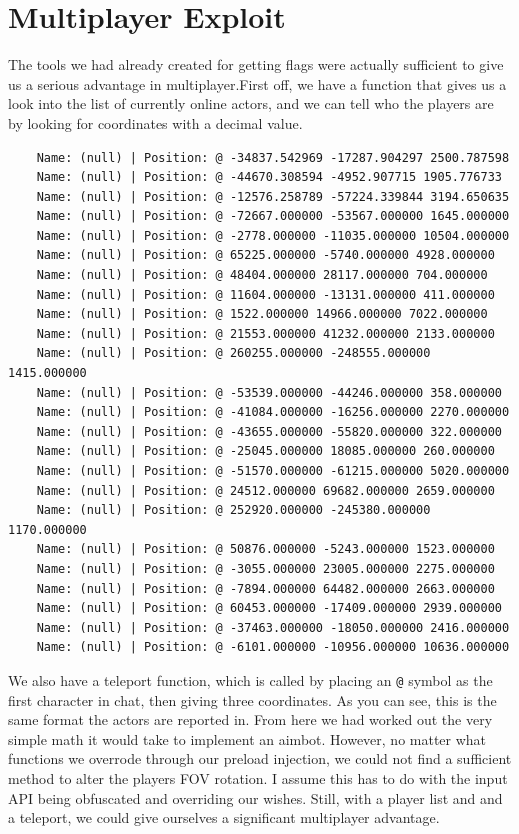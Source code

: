 \documentclass[11pt]{article}
\begin{document}
\section*{Multiplayer Exploit}
The tools we had already created for getting flags were actually sufficient to give us a serious advantage in multiplayer.First off, we have a function that gives us a look into the list of currently online actors, and we can tell who the players are by looking for coordinates with a decimal value. 
\begin{lstlisting}
    Name: (null) | Position: @ -34837.542969 -17287.904297 2500.787598
    Name: (null) | Position: @ -44670.308594 -4952.907715 1905.776733
    Name: (null) | Position: @ -12576.258789 -57224.339844 3194.650635
    Name: (null) | Position: @ -72667.000000 -53567.000000 1645.000000
    Name: (null) | Position: @ -2778.000000 -11035.000000 10504.000000
    Name: (null) | Position: @ 65225.000000 -5740.000000 4928.000000
    Name: (null) | Position: @ 48404.000000 28117.000000 704.000000
    Name: (null) | Position: @ 11604.000000 -13131.000000 411.000000
    Name: (null) | Position: @ 1522.000000 14966.000000 7022.000000
    Name: (null) | Position: @ 21553.000000 41232.000000 2133.000000
    Name: (null) | Position: @ 260255.000000 -248555.000000 1415.000000
    Name: (null) | Position: @ -53539.000000 -44246.000000 358.000000
    Name: (null) | Position: @ -41084.000000 -16256.000000 2270.000000
    Name: (null) | Position: @ -43655.000000 -55820.000000 322.000000
    Name: (null) | Position: @ -25045.000000 18085.000000 260.000000
    Name: (null) | Position: @ -51570.000000 -61215.000000 5020.000000
    Name: (null) | Position: @ 24512.000000 69682.000000 2659.000000
    Name: (null) | Position: @ 252920.000000 -245380.000000 1170.000000
    Name: (null) | Position: @ 50876.000000 -5243.000000 1523.000000
    Name: (null) | Position: @ -3055.000000 23005.000000 2275.000000
    Name: (null) | Position: @ -7894.000000 64482.000000 2663.000000
    Name: (null) | Position: @ 60453.000000 -17409.000000 2939.000000
    Name: (null) | Position: @ -37463.000000 -18050.000000 2416.000000
    Name: (null) | Position: @ -6101.000000 -10956.000000 10636.000000
\end{lstlisting}

We also have a teleport function, which is called by placing an \texttt{@} symbol as the first character in chat, then giving three coordinates. As you can see, this is the same format the actors are reported in. From here we had worked out the very simple math it would take to implement an aimbot. However, no matter what functions we overrode through our preload injection, we could not find a sufficient method to alter the players FOV rotation. I assume this has to do with the input API being obfuscated and overriding our wishes. Still, with a player list and and a teleport, we could give ourselves a significant multiplayer advantage.
\end{document}
